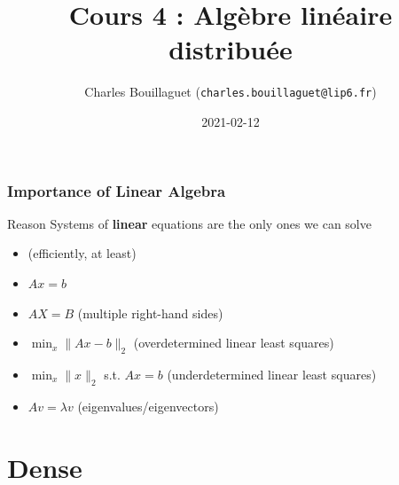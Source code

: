 \documentclass[xcolor={x11names,svgnames},x11names,svgnames]{beamer}
\author[C.~Bouillaguet]{Charles Bouillaguet \newline
  {\small (\texttt{charles.bouillaguet@lip6.fr})}}
\title{Cours 4 : Algèbre linéaire distribuée}
\date{2021-02-12}
\begin{document}
\begin{frame}[label=title]
  \titlepage
\end{frame}


\begin{frame}
  \frametitle{Importance of Linear Algebra}

  \begin{alertblock}{Reason}
  Systems of \textbf{linear} equations are the only ones we can solve
    \begin{itemize}
    \item (efficiently, at least)
    \end{itemize}
  \end{alertblock}

  \begin{itemize}
  \item $Ax = b$
  \item $AX = B$  \hfill (multiple right-hand sides)
  \item $\min_x \| Ax - b \|_2$ \hfill (overdetermined linear least squares)
  \item $\min_x \| x \|_2$ s.t. $Ax = b$ \hfill (underdetermined linear least squares)
  \item $Av = \lambda v$ \hfill (eigenvalues/eigenvectors)

  \end{itemize}

  \medskip

  \begin{center}
  \end{center}
\end{frame}


\section{Dense}
\end{document}

